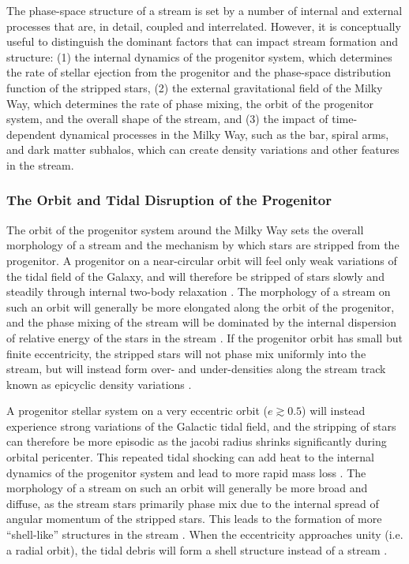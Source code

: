\documentclass[final,5p,times,twocolumn,authoryear]{elsarticle}
\begin{document}
The phase-space structure of a stream is set by a number of internal and external
processes that are, in detail, coupled and interrelated.
However, it is conceptually useful to distinguish the dominant factors that can impact
stream formation and structure:
(1) the internal dynamics of the progenitor system, which determines the rate of stellar
ejection from the progenitor and the phase-space distribution function of the stripped
stars,
(2) the external gravitational field of the Milky Way, which determines the rate of
phase mixing, the orbit of the progenitor system, and the overall shape of the stream,
and
(3) the impact of time-dependent dynamical processes in the Milky Way, such as the bar,
spiral arms, and dark matter subhalos, which can create density variations and other
features in the stream.


\subsubsection{The Orbit and Tidal Disruption of the Progenitor}

The orbit of the progenitor system around the Milky Way sets the overall morphology of a
stream and the mechanism by which stars are stripped from the progenitor.
A progenitor on a near-circular orbit will feel only weak variations of the tidal field
of the Galaxy, and will therefore be stripped of stars slowly and steadily through
internal two-body relaxation \citep[e.g.,][]{todo}.
The morphology of a stream on such an orbit will generally be more elongated along the
orbit of the progenitor, and the phase mixing of the stream will be dominated by the
internal dispersion of relative energy of the stars in the stream
\citep[e.g.,][]{hendel:2015}.
If the progenitor orbit has small but finite eccentricity, the stripped stars will not
phase mix uniformly into the stream, but will instead form over- and under-densities
along the stream track known as epicyclic density variations \citep{kuepper:xxx}.

A progenitor stellar system on a very eccentric orbit ($e \gtrsim 0.5$) will instead
experience strong variations of the Galactic tidal field, and the stripping of stars can
therefore be more episodic as the jacobi radius shrinks significantly during orbital
pericenter.
This repeated tidal shocking can add heat to the internal dynamics of the progenitor
system and lead to more rapid mass loss \citep[e.g.,][]{todo}.
The morphology of a stream on such an orbit will generally be more broad and diffuse, as
the stream stars primarily phase mix due to the internal spread of angular momentum of
the stripped stars.
This leads to the formation of more ``shell-like'' structures in the stream
\citep[e.g.,][]{hendel:2015}.
When the eccentricity approaches unity (i.e. a radial orbit), the tidal debris will form
a shell structure instead of a stream \citep[e.g.,][]{todo}.
\end{document}
